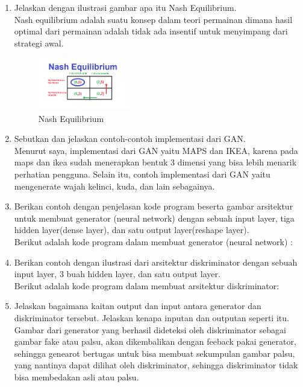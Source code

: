 \begin{enumerate}
\item Jelaskan dengan ilustrasi gambar apa itu Nash Equilibrium.\\
Nash equilibrium adalah suatu konsep dalam teori permainan dimana hasil optimal dari permainan adalah tidak ada insentif untuk menyimpang dari strategi awal. 
\begin{figure}[H]
	\includegraphics[width=4cm]{figures/1174054/8/7.png}
	\centering
	\caption{Nash Equilibrium}
\end{figure}

\item Sebutkan dan jelaskan contoh-contoh implementasi dari GAN.\\
Menurut saya, implementasi dari GAN yaitu MAPS dan IKEA, karena pada maps dan ikea sudah menerapkan bentuk 3 dimensi yang bisa lebih menarik perhatian pengguna. Selain itu, contoh implementasi dari GAN yaitu mengenerate wajah kelinci, kuda, dan lain sebagainya.

\item Berikan contoh dengan penjelasan kode program beserta gambar arsitektur untuk membuat generator (neural network) dengan sebuah input layer, tiga hidden layer(dense layer), dan satu output layer(reshape layer).\\
Berikut adalah kode program dalam membuat generator (neural network) :


\item Berikan contoh dengan ilustrasi dari arsitektur diskriminator dengan sebuah input layer, 3 buah hidden layer, dan satu output layer.\\
Berikut adalah kode program dalam membuat arsitektur diskriminator:


\item Jelaskan bagaimana kaitan output dan input antara generator dan diskriminator tersebut. Jelaskan kenapa inputan dan outputan seperti itu.\\
Gambar dari generator yang berhasil dideteksi oleh diskriminator sebagai gambar fake atau palsu, akan dikembalikan dengan feeback pakai generator, sehingga genearot bertugas untuk bisa membuat sekumpulan gambar palsu, yang nantinya dapat dilihat oleh diskriminator, sehingga diskriminator tidak bisa membedakan asli atau palsu.


\end{enumerate}
